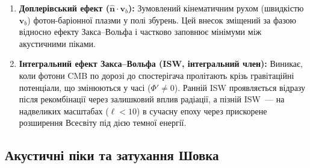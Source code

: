 \documentclass[12pt, a4paper]{article}
\begin{document}
\begin{enumerate}
        На суперхабблових масштабах у радіаційно-домінованій епосі
        рівняння збереження для фотонів і метричний потенціал $\Phi$
        пов'язані через рівняння Пуассона:
        $k^2\Phi \approx -4\pi G a^2 \bar\rho\,\delta$.
        У граничному випадку $k \to 0$ (масштаби значно більші за горизонт)
        розв'язок для адіабатичних початкових умов дає
        \cite{hu_sugiyama_1995}:
        \begin{equation*}
          \frac{1}{4}\delta_\gamma = -\frac{2}{3}\Phi,
        \end{equation*}
        де мінус означає, що надлишок густини фотонів ($\delta_\gamma > 0$)
        відповідає потенціальній ямі ($\Phi < 0$): плазма стиснута саме
        там, де є гравітаційний мінімум. Підставляючи у вираз для ефекту
        Закса--Вольфа:
        \begin{equation*}
          \frac{1}{4}\delta_\gamma + \Phi
          = -\frac{2}{3}\Phi + \Phi = \frac{1}{3}\Phi.
        \end{equation*}
        Знак «$+$»: фотони виходять з ями ($\Phi < 0$) і зазнають
        гравітаційного червоного зміщення, тобто виглядають
        \emph{холоднішими}. Ефект $\frac{1}{3}\Phi < 0$ означає
        дефіцит температури у напрямку потенціальної ями~---
        саме це формує плато Закса--Вольфа на великих масштабах.
  \item \textbf{Доплерівський ефект ($\hat{\mathbf{n}} \cdot \mathbf{v}_b$):} Зумовлений кінематичним рухом (швидкістю $\mathbf{v}_b$) фотон-баріонної плазми у полі збурень. Цей внесок зміщений за фазою відносно ефекту Закса--Вольфа і частково заповнює мінімуми між акустичними піками.
  \item \textbf{Інтегральний ефект Закса--Вольфа (ISW, інтегральний член):} Виникає, коли фотони CMB по дорозі до спостерігача пролітають крізь гравітаційні потенціали, що змінюються у часі ($\Phi' \neq 0$). Ранній ISW проявляється відразу після рекомбінації через залишковий вплив радіації, а пізній ISW~--- на надвеликих масштабах ($\ell < 10$) в сучасну епоху через прискорене розширення Всесвіту під дією темної енергії.
\end{enumerate}

\subsection{Акустичні піки та затухання Шовка}
\end{document}
